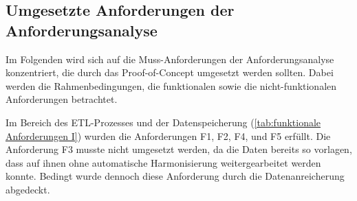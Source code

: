








\subsection{Umgesetzte Anforderungen der Anforderungsanalyse}
Im Folgenden wird sich auf die Muss-Anforderungen der Anforderungsanalyse konzentriert, die durch das Proof-of-Concept
umgesetzt werden sollten. Dabei werden die Rahmenbedingungen, die funktionalen sowie die nicht-funktionalen Anforderungen
betrachtet.

Im Bereich des ETL-Prozesses und der Datenspeicherung (\autoref{tab:funktionale Anforderungen I}) wurden die Anforderungen F1, F2, F4, und F5 erfüllt.
Die Anforderung F3 musste nicht umgesetzt werden, da die Daten bereits so vorlagen, dass auf ihnen ohne automatische Harmonisierung weitergearbeitet werden konnte.
Bedingt wurde dennoch diese Anforderung durch die Datenanreicherung abgedeckt.


